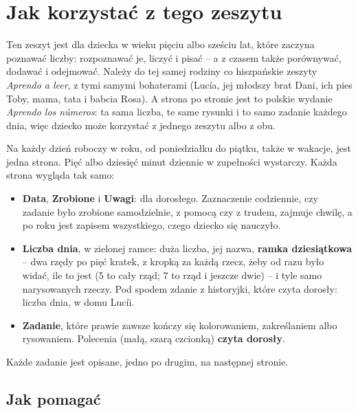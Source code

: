 \section*{Jak korzystać z tego zeszytu}

Ten zeszyt jest dla dziecka w wieku pięciu albo sześciu lat, które
zaczyna poznawać liczby: rozpoznawać je, liczyć i pisać -- a z czasem
także porównywać, dodawać i odejmować. Należy do tej samej rodziny co
hiszpańskie zeszyty \emph{Aprendo a leer}, z tymi samymi bohaterami
(Lucía, jej młodszy brat Dani, ich pies Toby, mama, tata i babcia Rosa).
A strona po stronie jest to polskie wydanie \emph{Aprendo los números}:
ta sama liczba, te same rysunki i to samo zadanie każdego dnia, więc
dziecko może korzystać z jednego zeszytu albo z obu.

Na każdy dzień roboczy w roku, od poniedziałku do piątku, także w
wakacje, jest jedna strona. Pięć albo dziesięć minut dziennie w
zupełności wystarczy. Każda strona wygląda tak samo:

\begin{itemize}[leftmargin=6mm]
\item \textbf{Data}, \textbf{Zrobione} i \textbf{Uwagi}: dla dorosłego.
  Zaznaczenie codziennie, czy zadanie było zrobione samodzielnie, z
  pomocą czy z trudem, zajmuje chwilę, a po roku jest zapisem
  wszystkiego, czego dziecko się nauczyło.
\item \textbf{Liczba dnia}, w zielonej ramce: duża liczba, jej nazwa,
  \textbf{ramka dziesiątkowa} -- dwa rzędy po pięć kratek, z kropką za
  każdą rzecz, żeby od razu było widać, ile to jest (5 to cały rząd; 7
  to rząd i jeszcze dwie) -- i tyle samo narysowanych rzeczy. Pod spodem
  zdanie z historyjki, które czyta dorosły: liczba dnia, w domu Lucíi.
\item \textbf{Zadanie}, które prawie zawsze kończy się kolorowaniem,
  zakreślaniem albo rysowaniem. Polecenia (małą, szarą czcionką)
  \textbf{czyta dorosły}.
\end{itemize}

Każde zadanie jest opisane, jedno po drugim, na następnej stronie.

\subsection*{Jak pomagać}

